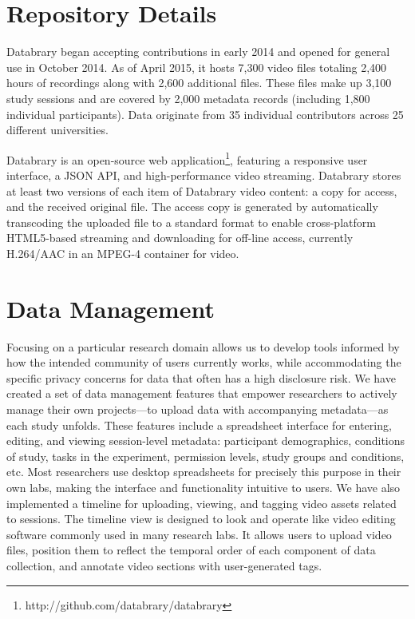 \documentclass{sig-alternate}
\begin{document}
\section{Repository Details}

Databrary began accepting contributions in early 2014 and opened for general use in October 2014.
As of April 2015, it hosts 7,300 video files totaling 2,400 hours of recordings along with 2,600 additional files.
These files make up 3,100 study sessions and are covered by 2,000 metadata records (including 1,800 individual participants).
Data originate from 35 individual contributors across 25 different universities.

Databrary is an open-source web application\footnote{http://github.com/databrary/databrary}, featuring a responsive user interface, a JSON API, and high-performance video streaming.
Databrary stores at least two versions of each item of Databrary video content: a copy for access, and the received original file.
The access copy is generated by automatically transcoding the uploaded file to a standard format to enable cross-platform HTML5-based streaming and downloading for off-line access, currently H.264/AAC in an MPEG-4 container for video.

\section{Data Management}

Focusing on a particular research domain allows us to develop tools informed by how the intended community of users currently works, while accommodating the specific privacy concerns for data that often has a high disclosure risk.
We have created a set of data management features that empower researchers to actively manage their own projects---to upload data with accompanying metadata---as each study unfolds. 
These features include a spreadsheet interface for entering, editing, and viewing session-level metadata: participant demographics, conditions of study, tasks in the experiment, permission levels, study groups and conditions, etc. 
Most researchers use desktop spreadsheets for precisely this purpose in their own labs, making the interface and functionality intuitive to users. 
We have also implemented a timeline for uploading, viewing, and tagging video assets related to sessions.
The timeline view is designed to look and operate like video editing software commonly used in many research labs.
It allows users to upload video files, position them to reflect the temporal order of each component of data collection, and annotate video sections with user-generated tags. 
\end{document}
